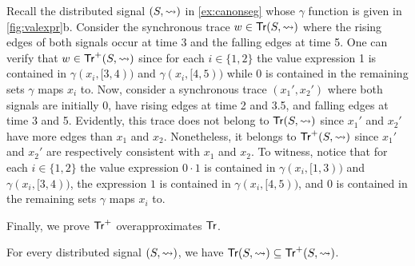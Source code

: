 \begin{example} \label{ex:overapx}
	Recall the distributed signal $(S, {\rightsquigarrow})$ in \cref{ex:canonseg} whose $\gamma$ function is given in \cref{fig:valexpr}b.
	Consider the synchronous trace $w \in \mathsf{Tr}(S, {\rightsquigarrow})$ where the rising edges of both signals occur at time 3 and the falling edges at time 5.
	One can verify that $w \in \mathsf{Tr}^+(S,{\rightsquigarrow})$ since for each $i \in \{1,2\}$ the value expression 1 is contained in $\gamma(x_i, [3,4))$ and $\gamma(x_i, [4,5))$ while 0 is contained in the remaining sets $\gamma$ maps $x_i$ to.
	Now, consider a synchronous trace $(x_1', x_2')$ where both signals are initially 0, have rising edges at time 2 and 3.5, and falling edges at time 3 and 5.
	Evidently, this trace does not belong to $\mathsf{Tr}(S, {\rightsquigarrow})$ since $x_1'$ and $x_2'$ have more edges than $x_1$ and $x_2$.
	Nonetheless, it belongs to $\mathsf{Tr}^+(S,{\rightsquigarrow})$ since $x_1'$ and $x_2'$ are respectively consistent with $x_1$ and $x_2$.
	To witness, notice that for each $i \in \{1,2\}$ the value expression $0 \cdot 1$ is contained in $\gamma(x_i, [1,3))$ and $\gamma(x_i, [3,4))$, the expression $1$ is contained in $\gamma(x_i, [4,5))$, and 0 is contained in the remaining sets $\gamma$ maps $x_i$ to.
\end{example}

Finally, we prove $\mathsf{Tr}^+$ overapproximates $\mathsf{Tr}$.

\begin{lemma} \label{cl:trsound}
	For every distributed signal $(S,{\rightsquigarrow})$, we have $\mathsf{Tr}(S,{\rightsquigarrow}) \subseteq \mathsf{Tr}^+(S,{\rightsquigarrow})$.
\end{lemma}

